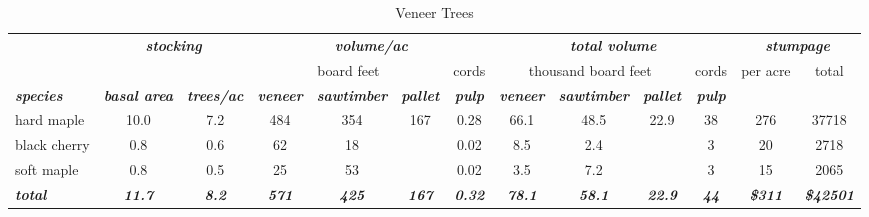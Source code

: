 \documentclass[landscape]{article}
\begin{document}
\begin{table}[H]

\caption{\label{tab:unnamed-chunk-18}Veneer Trees}
\fontsize{10}{12}\selectfont
\begin{tabular}[t]{lcccccccccccc}
\toprule
\multicolumn{1}{c}{\em{\textbf{ }}} & \multicolumn{2}{c}{\em{\textbf{stocking}}} & \multicolumn{4}{c}{\em{\textbf{volume/ac }}} & \multicolumn{4}{c}{\em{\textbf{total volume}}} & \multicolumn{2}{c}{\em{\textbf{stumpage}}} \\
\cmidrule(l{3pt}r{3pt}){2-3} \cmidrule(l{3pt}r{3pt}){4-7} \cmidrule(l{3pt}r{3pt}){8-11} \cmidrule(l{3pt}r{3pt}){12-13}
\multicolumn{3}{c}{ } & \multicolumn{3}{c}{board feet} & \multicolumn{1}{c}{cords} & \multicolumn{3}{c}{thousand board feet} & \multicolumn{1}{c}{cords} & \multicolumn{1}{c}{per acre} & \multicolumn{1}{c}{total} \\
\cmidrule(l{3pt}r{3pt}){4-6} \cmidrule(l{3pt}r{3pt}){7-7} \cmidrule(l{3pt}r{3pt}){8-10} \cmidrule(l{3pt}r{3pt}){11-11} \cmidrule(l{3pt}r{3pt}){12-12} \cmidrule(l{3pt}r{3pt}){13-13}
\rowcolor[HTML]{DCDCDC}  \em{\textbf{species}} & \em{\textbf{basal area}} & \em{\textbf{trees/ac}} & \em{\textbf{veneer}} & \em{\textbf{sawtimber}} & \em{\textbf{pallet}} & \em{\textbf{pulp}} & \em{\textbf{veneer}} & \em{\textbf{sawtimber}} & \em{\textbf{pallet}} & \em{\textbf{pulp}} & \em{\textbf{ }} & \em{\textbf{ }}\\
\midrule
\rowcolor{gray!6}  hard maple & 10.0 & 7.2 & 484 & 354 & 167 & 0.28 & 66.1 & 48.5 & 22.9 & 38 & 276 & 37718\\
 
black cherry & 0.8 & 0.6 & 62 & 18 &  & 0.02 & 8.5 & 2.4 &  & 3 & 20 & 2718\\
 
\rowcolor{gray!6}  soft maple & 0.8 & 0.5 & 25 & 53 &  & 0.02 & 3.5 & 7.2 &  & 3 & 15 & 2065\\
 
\rowcolor[HTML]{DCDCDC}  \em{\textbf{total}} & \em{\textbf{11.7}} & \em{\textbf{8.2}} & \em{\textbf{571}} & \em{\textbf{425}} & \em{\textbf{167}} & \em{\textbf{0.32}} & \em{\textbf{78.1}} & \em{\textbf{58.1}} & \em{\textbf{22.9}} & \em{\textbf{44}} & \em{\textbf{\$311}} & \em{\textbf{\$42501}}\\
\bottomrule
\end{tabular}
\end{table}
\end{document}
